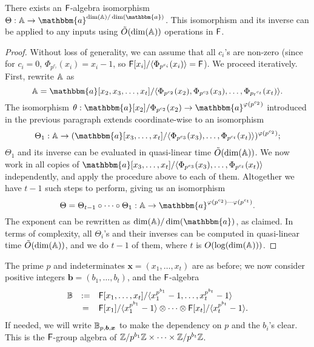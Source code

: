 \begin{lemma}\label{lemma:A}
  There exists an ${\mathsf{F}}$-algebra isomorphism $\Theta: \A \to
  \mathbbm{a}^{\dim(\A)/\dim(\mathbbm{a})}$. This isomorphism and its
  inverse can be applied to any inputs using $\tilde{O}(\dim(\mathbb{A}))$
  operations in ${\mathsf{F}}$.
\end{lemma}
\begin{proof}
Without loss of generality, we can assume that all $c_i$'s are non-zero
(since for $c_i=0$, $\Phi_{p^{c_i}}(x_i)=x_i-1$,
so ${\mathsf{F}}[x_i]/\langle \Phi_{p^{c_i}}(x_i) \rangle = {\mathsf{F}}$).
We proceed iteratively. First, rewrite $\mathbb{A}$ as
$$\A=\mathbbm{a}[x_2,x_3,\dots,x_t]/\langle \Phi_{p^{c_2}}(x_2), \Phi_{p^{c_3}}(x_3), \dots,
\Phi_{{p_t}^{c_t}}(x_t)\rangle.$$ 
The isomorphism 
$\theta: \mathbbm{a}[x_2]/\Phi_{p^{c_2}}(x_2) \to \mathbbm{a}^{\varphi(p^{c_2})}$
introduced in the previous paragraph extends coordinate-wise
to an isomorphism 
$$\Theta_1: \A \to (\mathbbm{a}[x_3,\dots,x_t]/\langle
\Phi_{p^{c_3}}(x_3), \dots,
\Phi_{p^{c_t}}(x_t)\rangle)^{\varphi(p^{c_2})};$$ $\Theta_1$ and its
inverse can be evaluated in quasi-linear time $\tilde{O}(\dim(\mathbb{A}))$.
We now work in all copies of $\mathbbm{a}[x_3,\dots,x_t]/\langle
\Phi_{p^{c_3}}(x_3), \dots, \Phi_{p^{c_t}}(x_t)\rangle$ independently,
and apply the procedure above to each of them. Altogether we have
$t-1$ such steps to perform, giving us an isomorphism
$$\Theta = \Theta_{t-1} \circ \cdots \circ \Theta_1:
\A \to
\mathbbm{a}^{\varphi(p^{c_2}) \cdots \varphi(p^{c_t})}.$$
The exponent can be rewritten as $ \dim(\A)/\dim(\mathbbm{a})$, as claimed.
In terms of complexity, all $\Theta_i$'s and their inverses can be computed
in quasi-linear time $\tilde{O}(\dim(\mathbb{A}))$, and we do $t-1$ of them,
where $t$ is $O(\log(\dim(\mathbb{A})))$. 
\end{proof}

  The prime $p$
and indeterminates $\boldsymbol{x}=(x_1,\dots,x_t)$ are as before; we now consider
positive integers $\boldsymbol{b}=(b_1,\dots,b_t)$, and the ${\mathsf{F}}$-algebra
\[
\begin{array}{ccl}
\B&:=&\F[x_1,\dots,x_t]/\langle x_1^{p^{b_1}}-1,\dots,x_t^{p^{b_t}}-1\rangle\\$$
&=& \F[x_1]/\langle x_1^{p^{b_1}}-1 \rangle \otimes \cdots \otimes \F[x_t]/\langle x_t^{p^{b_t}}-1 \rangle.
\end{array}
\]
If needed, we will write $\mathbb{B}_{p,\boldsymbol{b},\boldsymbol{x}}$ to make the dependency
on $p$ and the $b_i$'s clear. This is the ${\mathsf{F}}$-group algebra
of $\mathbb{Z}/p^{b_1}\mathbb{Z} \times \cdots \times \mathbb{Z}/p^{b_t}\mathbb{Z}$.

